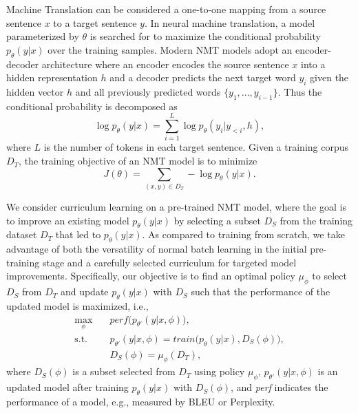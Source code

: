 \documentclass[letterpaper]{article}
\begin{document}
Machine Translation can be considered a one-to-one mapping from a source sentence $x$ to a target sentence $y$. In neural machine translation, a model parameterized by $\theta$ is searched for to maximize the conditional probability $p_\theta(y|x)$ over the training samples.
Modern NMT models adopt an encoder-decoder architecture where an encoder encodes the source sentence $x$ into a hidden representation $h$ and a decoder predicts the next target word $y_i$ given the hidden vector $h$ and all previously predicted words $\{y_1,...,y_{i-1}\}$. Thus the conditional probability is decomposed as
\begin{equation}
	\label{eq:nmtDecompose}
	\log p_\theta(y|x)=\sum_{i=1}^L \log p_\theta(y_i|y_{<i},h),
\end{equation}
where $L$ is the number of tokens in each target sentence. Given a training corpus $D_T$, the training objective of an NMT model is to minimize
\begin{equation}
	\label{eq:nmtObjective}
	J(\theta) = \sum_{(x,y)\in D_T} -\log p_\theta(y|x).
\end{equation}

We consider curriculum learning on a pre-trained NMT model, where the goal is to improve an existing model $p_\theta(y|x)$ by selecting a subset $D_S$ from the training dataset $D_T$ that led to $p_\theta(y|x)$. As compared to training from scratch, we take advantage of both the versatility of normal batch learning in the initial pre-training stage and a carefully selected curriculum for targeted model improvements.
Specifically, our objective is to find an optimal policy $\mu_\phi$ to select $D_S$ from $D_T$ and update $p_\theta(y|x)$ with $D_S$ such that the performance of the updated model is maximized, i.e.,
\begin{equation}
\begin{aligned}
		\max_\phi &\quad \textit{perf}\Big(p_{\theta'}(y|x,\phi)\Big),\\
		\text{s.t.} & \quad p_{\theta'}(y|x,\phi) = \textit{train}\Big(p_\theta(y|x), D_S(\phi)\Big),\\
		& \quad D_S(\phi) = \mu_\phi(D_T),
\end{aligned}
\end{equation}
where $D_S(\phi)$ is a subset selected from $D_T$ using policy $\mu_\phi$, $p_{\theta'}(y|x,\phi)$ is an updated model after training $p_\theta(y|x)$ with $D_S(\phi)$, and \textit{perf} indicates the performance of a model, e.g., measured by BLEU or Perplexity.
\end{document}
